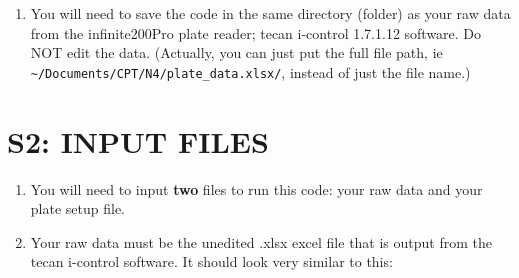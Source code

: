 \documentclass[12pt]{article}
\begin{document}
\begin{enumerate}
\item You will need to save the code in the same directory (folder) as your raw data from the infinite200Pro plate reader; tecan i-control 1.7.1.12 software. Do NOT edit the data. (Actually, you can just put the full file path, ie \texttt{\textasciitilde{}/Documents/CPT/N4/plate\_data.xlsx/}, instead of just the file name.)
\end{enumerate}

\section*{S2: INPUT FILES}
\label{sec:orgc3cc7db}
\begin{enumerate}
\item You will need to input \textbf{two} files to run this code: your raw data
and your plate setup file.

\item Your raw data must be the unedited .xlsx excel file that is output
from the tecan i-control software. It should look very similar to
this:


\end{enumerate}
\end{document}
